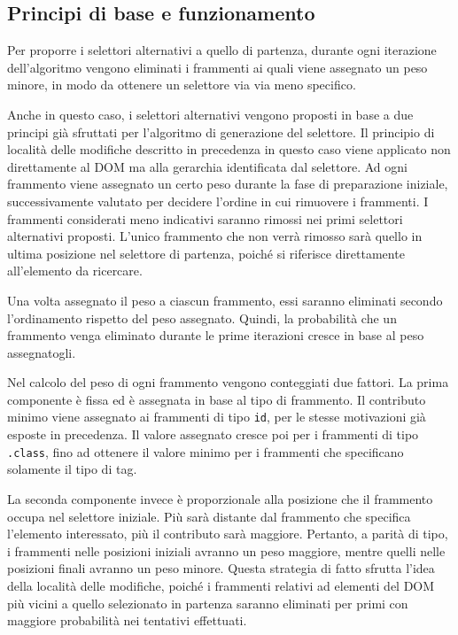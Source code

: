 \subsection{Principi di base e funzionamento}

Per proporre i selettori alternativi a quello di partenza, durante ogni iterazione dell'algoritmo vengono eliminati i frammenti ai quali viene assegnato un peso minore, in modo da ottenere un selettore via via meno specifico. 

Anche in questo caso, i selettori alternativi vengono proposti in base a due principi già sfruttati per l'algoritmo di generazione del selettore. Il principio di località delle modifiche descritto in precedenza in questo caso viene applicato non direttamente al DOM ma alla gerarchia identificata dal selettore. Ad ogni frammento viene assegnato un certo peso durante la fase di preparazione iniziale, successivamente valutato per decidere l'ordine in cui rimuovere i frammenti. I frammenti considerati meno indicativi saranno rimossi nei primi selettori alternativi proposti. L'unico frammento che non verrà rimosso sarà quello in ultima posizione nel selettore di partenza, poiché si riferisce direttamente all'elemento da ricercare. 

Una volta assegnato il peso a ciascun frammento, essi saranno eliminati secondo l'ordinamento rispetto del peso assegnato. Quindi, la probabilità che un frammento venga eliminato durante le prime iterazioni cresce in base al peso assegnatogli.

Nel calcolo del peso di ogni frammento vengono conteggiati due fattori. La prima componente è fissa ed è assegnata in base al tipo di frammento. Il contributo minimo viene assegnato ai frammenti di tipo \verb|id|, per le stesse motivazioni già esposte in precedenza. Il valore assegnato cresce poi per i frammenti di tipo \verb|.class|, fino ad ottenere il valore minimo per i frammenti che specificano solamente il tipo di tag.

La seconda componente invece è proporzionale alla posizione che il frammento occupa nel selettore iniziale. Più sarà distante dal frammento che specifica l'elemento interessato, più il contributo sarà maggiore. Pertanto, a parità di tipo, i frammenti nelle posizioni iniziali avranno un peso maggiore, mentre quelli nelle posizioni finali avranno un peso minore. Questa strategia di fatto sfrutta l'idea della località delle modifiche, poiché i frammenti relativi ad elementi del DOM più vicini a quello selezionato in partenza saranno eliminati per primi con maggiore probabilità nei tentativi effettuati.

